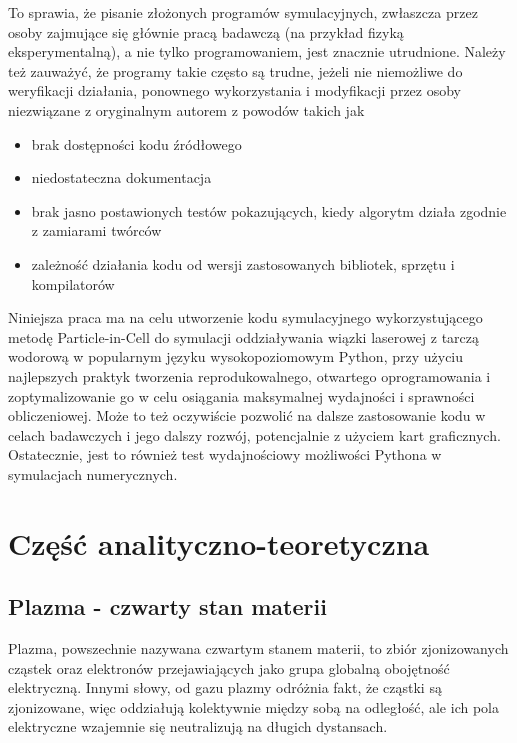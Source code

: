     To sprawia, że pisanie złożonych programów symulacyjnych, zwłaszcza przez osoby
    zajmujące się głównie pracą badawczą (na przykład fizyką eksperymentalną), a nie
    tylko programowaniem,
    jest znacznie utrudnione. Należy też zauważyć, że programy takie często są
    trudne, jeżeli nie niemożliwe do weryfikacji działania, ponownego wykorzystania
    i modyfikacji przez osoby niezwiązane z oryginalnym autorem z powodów takich jak
    \begin{itemize}
        \item brak dostępności kodu źródłowego
        \item niedostateczna dokumentacja
        \item brak jasno postawionych testów pokazujących, kiedy algorytm działa zgodnie z zamiarami twórców
        \item zależność działania kodu od wersji zastosowanych bibliotek, sprzętu i kompilatorów
    \end{itemize}

    Niniejsza praca ma na celu utworzenie kodu symulacyjnego wykorzystującego metodę Particle-in-Cell
    do symulacji oddziaływania wiązki laserowej z tarczą wodorową w popularnym języku
    wysokopoziomowym Python, przy użyciu najlepszych praktyk tworzenia reprodukowalnego, otwartego oprogramowania
    i zoptymalizowanie go w celu osiągania maksymalnej wydajności i sprawności obliczeniowej. Może to też oczywiście
    pozwolić na dalsze
    zastosowanie kodu w celach badawczych i jego dalszy rozwój, potencjalnie z użyciem kart graficznych.
    Ostatecznie, jest to również test wydajnościowy możliwości Pythona w symulacjach 
    numerycznych.

\section[Część analityczno-teoretyczna]{Część analityczno-teoretyczna} %

    \subsection{Plazma - czwarty stan materii}

    Plazma, powszechnie nazywana czwartym stanem materii, to zbiór zjonizowanych 
    cząstek oraz elektronów przejawiających jako grupa globalną obojętność elektryczną. Innymi słowy, od gazu plazmy
    odróżnia fakt, że cząstki są zjonizowane, więc oddziałują kolektywnie między sobą na odległość,
    ale ich pola elektryczne wzajemnie się neutralizują na długich dystansach.

